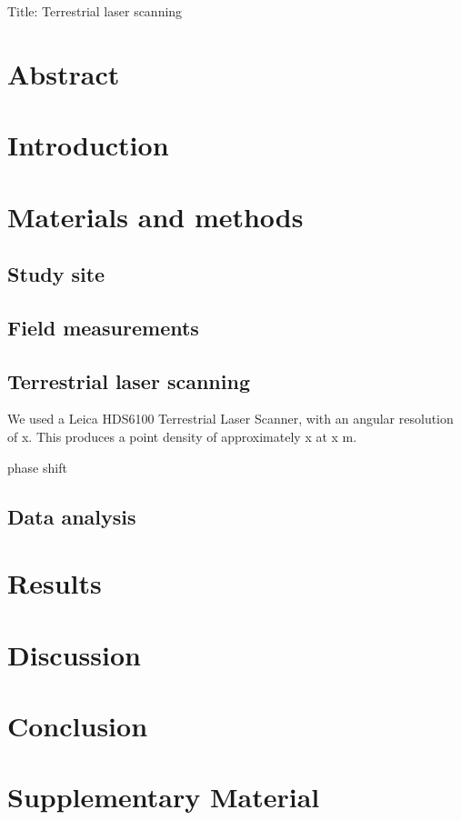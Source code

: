 \documentclass[11pt,a4paper]{article}
\newcommand{\beginsupplement}{%
	\setcounter{table}{0}
	\renewcommand{\thetable}{S\arabic{table}}%
	\setcounter{figure}{0}
	\renewcommand{\thefigure}{S\arabic{figure}}%
	}
\newcommand{\titletext}{Terrestrial laser scanning}
\begin{document}
{\Large{Title: \titletext{}}}


\section*{Abstract}

\section{Introduction}

\section{Materials and methods}

\subsection{Study site}

\subsection{Field measurements}

\subsection{Terrestrial laser scanning}

We used a Leica HDS6100 Terrestrial Laser Scanner, with an angular resolution of x. This produces a point density of approximately x at x m.

phase shift

\subsection{Data analysis}

\section{Results}

\section{Discussion}

\section{Conclusion}

\printbibliography

\section{Supplementary Material}
\beginsupplement
\end{document}
